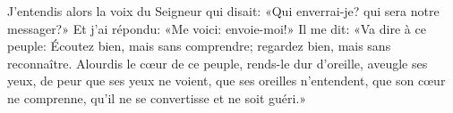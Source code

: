 J’entendis alors la voix du Seigneur qui disait:
	«Qui enverrai-je? qui sera notre messager?»
	Et j’ai répondu: «Me voici: envoie-moi!»
Il me dit: «Va dire à ce peuple:
	Écoutez bien, mais sans comprendre; regardez bien, mais sans reconnaître.
	Alourdis le cœur de ce peuple, rends-le dur d’oreille, aveugle ses yeux,
	de peur que ses yeux ne voient, que ses oreilles n’entendent,
	que son cœur ne comprenne, qu’il ne se convertisse et ne soit guéri.»
